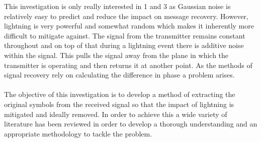 This investigation is only really interested in 1 and 3 as Gaussian noise is relatively easy to predict and reduce the impact on message recovery. However, lightning is very powerful and somewhat random which makes it inherently more difficult to mitigate against. The signal from the transmitter remains constant throughout and on top of that during a lightning event there is additive noise within the signal. This pulls the signal away from the plane in which the transmitter is operating and then returns it at another point. As the methods of signal recovery rely on calculating the difference in phase a problem arises.
\\\\
The objective of this investigation is to develop a method of extracting the original symbols from the received signal so that the impact of lightning is mitigated and ideally removed. In order to achieve this a wide variety of literature has been reviewed in order to develop a thorough understanding and an appropriate methodology to tackle the problem. 


